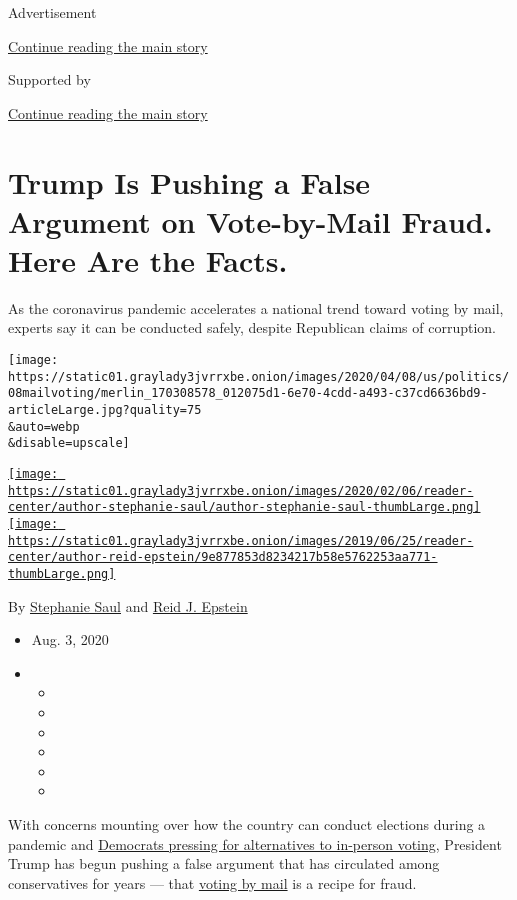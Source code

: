 Advertisement

\protect\hyperlink{after-top}{Continue reading the main story}

Supported by

\protect\hyperlink{after-sponsor}{Continue reading the main story}

\hypertarget{trump-is-pushing-a-false-argument-on-vote-by-mail-fraud-here-are-the-facts}{%
\section{Trump Is Pushing a False Argument on Vote-by-Mail Fraud. Here
Are the
Facts.}\label{trump-is-pushing-a-false-argument-on-vote-by-mail-fraud-here-are-the-facts}}

As the coronavirus pandemic accelerates a national trend toward voting
by mail, experts say it can be conducted safely, despite Republican
claims of corruption.

\texttt{[image: https://static01.graylady3jvrrxbe.onion/images/2020/04/08/us/politics/08mailvoting/merlin\_170308578\_012075d1-6e70-4cdd-a493-c37cd6636bd9-articleLarge.jpg?quality=75\\\&auto=webp\\\&disable=upscale]}

\href{https://www.nytimes3xbfgragh.onion/by/stephanie-saul}{\texttt{[image: https://static01.graylady3jvrrxbe.onion/images/2020/02/06/reader-center/author-stephanie-saul/author-stephanie-saul-thumbLarge.png]}}\href{https://www.nytimes3xbfgragh.onion/by/reid-j-epstein}{\texttt{[image: https://static01.graylady3jvrrxbe.onion/images/2019/06/25/reader-center/author-reid-epstein/9e877853d8234217b58e5762253aa771-thumbLarge.png]}}

By \href{https://www.nytimes3xbfgragh.onion/by/stephanie-saul}{Stephanie
Saul} and
\href{https://www.nytimes3xbfgragh.onion/by/reid-j-epstein}{Reid J.
Epstein}

\begin{itemize}
\item
  Aug. 3, 2020
\item
  \begin{itemize}
  \item
  \item
  \item
  \item
  \item
  \item
  \end{itemize}
\end{itemize}

With concerns mounting over how the country can conduct elections during
a pandemic and
\href{https://www.nytimes3xbfgragh.onion/2020/04/08/us/politics/democrats-coronavirus-voting.html}{Democrats
pressing for alternatives to in-person voting}, President Trump has
begun pushing a false argument that has circulated among conservatives
for years --- that
\href{https://www.nytimes3xbfgragh.onion/2020/08/03/us/politics/trump-mail-in-voting.html}{voting
by mail} is a recipe for fraud.

